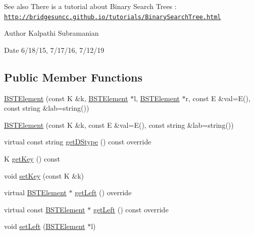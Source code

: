 \begin{DoxySeeAlso}{See also}
There is a tutorial about Binary Search Trees \+: \href{http://bridgesuncc.github.io/tutorials/BinarySearchTree.html}{\tt http\+://bridgesuncc.\+github.\+io/tutorials/\+Binary\+Search\+Tree.\+html}
\end{DoxySeeAlso}
\begin{DoxyAuthor}{Author}
Kalpathi Subramanian 
\end{DoxyAuthor}
\begin{DoxyDate}{Date}
6/18/15, 7/17/16, 7/12/19 
\end{DoxyDate}
\subsection*{Public Member Functions}
\begin{DoxyCompactItemize}
\item 
\hyperlink{classbridges_1_1datastructure_1_1_b_s_t_element_a861caf985c223a9a848082fd5a4974fd}{B\+S\+T\+Element} (const K \&k, \hyperlink{classbridges_1_1datastructure_1_1_b_s_t_element}{B\+S\+T\+Element} $\ast$l, \hyperlink{classbridges_1_1datastructure_1_1_b_s_t_element}{B\+S\+T\+Element} $\ast$r, const E \&val=E(), const string \&lab=string())
\item 
\hyperlink{classbridges_1_1datastructure_1_1_b_s_t_element_a839372e61dd261d3fd7df1d22dd0a5dd}{B\+S\+T\+Element} (const K \&k, const E \&val=E(), const string \&lab=string())
\item 
virtual const string \hyperlink{classbridges_1_1datastructure_1_1_b_s_t_element_a2bb8cc9ec4b6bc5b89ecef0f17be366f}{get\+D\+Stype} () const override
\item 
K \hyperlink{classbridges_1_1datastructure_1_1_b_s_t_element_a66bd1d5874e4e0c8048e03e5fff07f86}{get\+Key} () const
\item 
void \hyperlink{classbridges_1_1datastructure_1_1_b_s_t_element_a06d80480736ae19052e2d1bc6345323a}{set\+Key} (const K \&k)
\item 
virtual \hyperlink{classbridges_1_1datastructure_1_1_b_s_t_element}{B\+S\+T\+Element} $\ast$ \hyperlink{classbridges_1_1datastructure_1_1_b_s_t_element_af863c624691c11db26ae3b6d723d1f5c}{get\+Left} () override
\item 
virtual const \hyperlink{classbridges_1_1datastructure_1_1_b_s_t_element}{B\+S\+T\+Element} $\ast$ \hyperlink{classbridges_1_1datastructure_1_1_b_s_t_element_abac324ef0b480420bd82ecfe4501d60d}{get\+Left} () const override
\item 
void \hyperlink{classbridges_1_1datastructure_1_1_b_s_t_element_a5810ed79b697d691f4d8a75c2f9b639f}{set\+Left} (\hyperlink{classbridges_1_1datastructure_1_1_b_s_t_element}{B\+S\+T\+Element} $\ast$l)

\end{DoxyCompactItemize}
